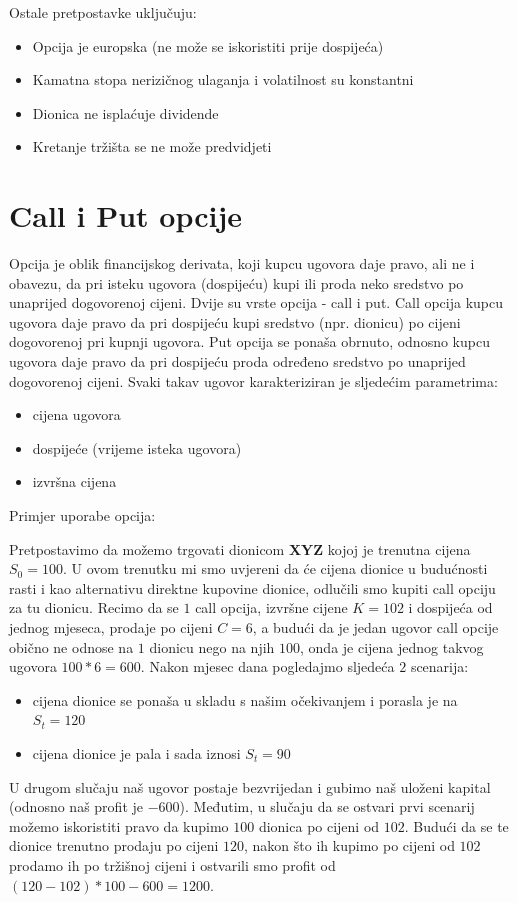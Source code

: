 \documentclass[times, utf8, seminar]{fer}
\begin{document}
\noindent Ostale pretpostavke uključuju:
\begin{itemize}
    \item[\textbullet] Opcija je europska (ne može se iskoristiti prije dospijeća)
    \item[\textbullet] Kamatna stopa nerizičnog ulaganja i volatilnost su konstantni
    \item[\textbullet] Dionica ne isplaćuje dividende
    \item[\textbullet] Kretanje tržišta se ne može predvidjeti
\end{itemize}

\section{Call i Put opcije}
Opcija je oblik financijskog derivata, koji kupcu ugovora daje pravo, ali ne i obavezu, da pri isteku ugovora (dospijeću) kupi ili proda neko sredstvo po unaprijed dogovorenoj cijeni. Dvije su vrste opcija - call i put. Call opcija kupcu ugovora daje pravo da pri dospijeću kupi sredstvo (npr. dionicu) po cijeni dogovorenoj pri kupnji ugovora. Put opcija se ponaša obrnuto, odnosno kupcu ugovora daje pravo da pri dospijeću proda određeno sredstvo po unaprijed dogovorenoj cijeni. Svaki takav ugovor karakteriziran je sljedećim parametrima:
\begin{itemize}
    \item[\textbullet] cijena ugovora
    \item[\textbullet] dospijeće (vrijeme isteka ugovora)
    \item[\textbullet] izvršna cijena
\end{itemize}

\noindent Primjer uporabe opcija:

Pretpostavimo da možemo trgovati dionicom \textbf{XYZ} kojoj je trenutna cijena $S_0 = 100$. U ovom trenutku mi smo uvjereni da će cijena dionice u budućnosti rasti i kao alternativu direktne kupovine dionice, odlučili smo kupiti call opciju za tu dionicu. Recimo da se $1$ call opcija, izvršne cijene $K = 102$ i dospijeća od jednog mjeseca, prodaje po cijeni $C = 6$, a budući da je jedan ugovor call opcije obično ne odnose na $1$ dionicu nego na njih $100$, onda je cijena jednog takvog ugovora $100 * 6 = 600$. Nakon mjesec dana pogledajmo sljedeća $2$ scenarija:
\begin{itemize}
    \item[\textbullet] cijena dionice se ponaša u skladu s našim očekivanjem i porasla je na $S_t = 120$
    \item[\textbullet] cijena dionice je pala i sada iznosi $S_t = 90$
\end{itemize}
\noindent U drugom slučaju naš ugovor postaje bezvrijedan i gubimo naš uloženi kapital (odnosno naš profit je $-600$). Međutim, u slučaju da se ostvari prvi scenarij možemo iskoristiti pravo da kupimo $100$ dionica po cijeni od $102$. Budući da se te dionice trenutno prodaju po cijeni $120$, nakon što ih kupimo po cijeni od $102$ prodamo ih po tržišnoj cijeni i ostvarili smo profit od $(120 - 102) * 100 - 600 = 1200$.\\
\end{document}
